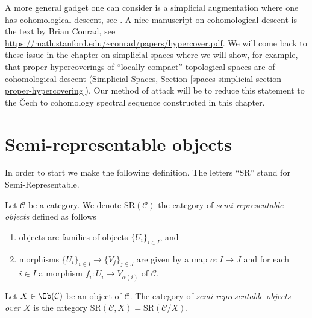 \medskip\noindent
A more general gadget one can consider is a simplicial augmentation where
one has cohomological descent, see \cite[Expos\'e Vbis]{SGA4}. A nice
manuscript on cohomological descent is the text by Brian Conrad, see
\url{https://math.stanford.edu/~conrad/papers/hypercover.pdf}.
We will come back to these issue in the chapter on simplicial spaces
where we will show, for example, that proper hypercoverings of
``locally compact'' topological spaces are of cohomological
descent (Simplicial Spaces, Section
\ref{spaces-simplicial-section-proper-hypercovering}).
Our method of attack will be to reduce this statement to the {\v C}ech to
cohomology spectral sequence constructed in this chapter.






























\section{Semi-representable objects}
\label{section-semi-representable}

\noindent
In order to start we make the following definition.
The letters ``SR'' stand for Semi-Representable.

\begin{definition}
\label{definition-SR}
Let $\mathcal{C}$ be a category. We denote $\text{SR}(\mathcal{C})$
the category of {\it semi-representable objects} defined as follows
\begin{enumerate}
\item objects are families of objects $\{U_i\}_{i \in I}$, and
\item morphisms $\{U_i\}_{i \in I} \to \{V_j\}_{j \in J}$ are given by
a map $\alpha : I \to J$ and for each $i \in I$
a morphism $f_i : U_i \to V_{\alpha(i)}$ of $\mathcal{C}$.
\end{enumerate}
Let $X \in \Ob(\mathcal{C})$ be an object of $\mathcal{C}$.
The category of {\it semi-representable objects over $X$}
is the category
$\text{SR}(\mathcal{C}, X) = \text{SR}(\mathcal{C}/X)$.
\end{definition}

